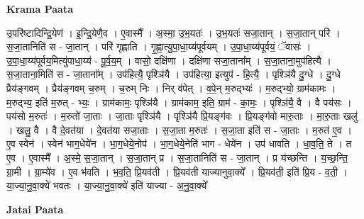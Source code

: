 \documentclass[17pt]{extarticle}
\begin{document}
\textbf{Krama Paata} \newline

उ॒परि॑ष्टादिन्द्रि॒येण॑ । इ॒न्द्रि॒येणै॒व । ए॒वास्मै᳚ । अ॒स्मा॒ उ॒भ॒यतः॑ । उ॒भ॒यतः॑ सजा॒तान् । स॒जा॒तान् परि॑ । स॒जा॒तानिति॑ स - जा॒तान् । परि॑ गृह्णाति । गृ॒ह्णा॒त्यु॒पा॒धा॒य्य॑पूर्वयम् । उ॒पा॒धा॒य्य॑पूर्वयं॒ ॅवासः॑ । उ॒पा॒धा॒य्य॑पूर्वय॒मित्यु॑पाधा॒य्य॑ - पू॒र्व॒य॒म् । वासो॒ दक्षि॑णा । दक्षि॑णा सजा॒ताना᳚म् । स॒जा॒ताना॒मुप॑हित्यै । स॒जा॒ताना॒मिति॑ स - जा॒ताना᳚म् । उप॑हित्यै॒ पृश्ञि॑यै । उप॑हित्या॒ इत्युप॑ - हि॒त्यै॒ । पृश्ञि॑यै दु॒ग्धे । दु॒ग्धे प्रैय॑ङ्गवम् । प्रैय॑ङ्गवम् च॒रुम् । च॒रुम् निः । निर् व॑पेत् । व॒पे॒न् म॒रुद्भ्यः॑ । म॒रुद्भ्यो॒ ग्राम॑कामः । म॒रुद्भ्य॒ इति॑ म॒रुत् - भ्यः॒ । ग्राम॑कामः॒ पृश्ञि॑यै । ग्राम॑काम॒ इति॒ ग्राम॑ - का॒मः॒ । पृश्ञि॑यै॒ वै । वै पय॑सः । पय॑सो म॒रुतः॑ । म॒रुतो॑ जा॒ताः । जा॒ताः पृश्ञि॑यै । पृश्ञि॑यै प्रि॒यङ्ग॑वः । प्रि॒यङ्ग॑वो मारु॒ताः । मा॒रु॒ताः खलु॑ । खलु॒ वै । वै दे॒वत॑या । दे॒वत॑या सजा॒ताः । स॒जा॒ता म॒रुतः॑ । स॒जा॒ता इति॑ स - जा॒ताः । म॒रुत॑ ए॒व । ए॒व स्वेन॑ । स्वेन॑ भाग॒धेये॑न । भा॒ग॒धेये॒नोप॑ । भा॒ग॒धेये॒नेति॑ भाग - धेये॑न । उप॑ धावति । धा॒व॒ति॒ ते । त ए॒व । ए॒वास्मै᳚ । अ॒स्मे॒ स॒जा॒तान् । स॒जा॒तान् प्र । स॒जा॒तानिति॑ स - जा॒तान् । प्र य॑च्छन्ति । य॒च्छ॒न्ति॒ ग्रा॒मी । ग्रा॒म्ये॑व । ए॒व भ॑वति । भ॒व॒ति॒ प्रि॒यव॑ती । प्रि॒यव॑ती याज्यानुवा॒क्ये᳚ । प्रि॒यव॑ती॒ इति॑ प्रि॒य - व॒ती॒ । या॒ज्या॒नु॒वा॒क्ये॑ भवतः । या॒ज्या॒नु॒वा॒क्ये॑ इति॑ याज्या - अ॒नु॒वा॒क्ये᳚ \newline

\textbf{Jatai Paata} \newline
\end{document}
